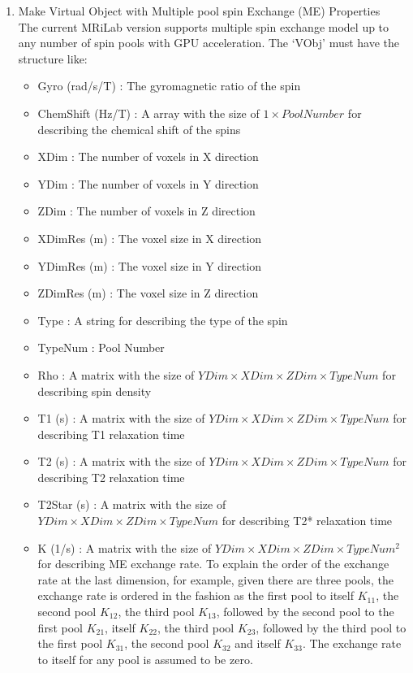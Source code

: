 \documentclass{book}%
\begin{document}
\begin{enumerate}
\item Make Virtual Object with Multiple pool spin Exchange (ME) Properties\\

The current MRiLab version supports multiple spin exchange model up to any number of spin pools with GPU acceleration. The `VObj' must have the structure like:

\begin{itemize}
	\item Gyro (rad/s/T) : The gyromagnetic ratio of the spin
	\item ChemShift (Hz/T) : A array with the size of $1 \times Pool Number $ for describing the chemical shift of the spins
	\item XDim : The number of voxels in X direction
	\item YDim : The number of voxels in Y direction
	\item ZDim : The number of voxels in Z direction
	\item XDimRes (m) : The voxel size in X direction
	\item YDimRes (m) : The voxel size in Y direction
	\item ZDimRes (m) : The voxel size in Z direction
	\item Type : A string for describing the type of the spin
	\item TypeNum : Pool Number
	\item Rho : A matrix with the size of $ YDim \times XDim \times ZDim \times TypeNum $ for describing spin density
	\item T1 (s) : A matrix with the size of $ YDim \times XDim \times ZDim \times TypeNum $ for describing T1 relaxation time
	\item T2 (s) : A matrix with the size of $ YDim \times XDim \times ZDim \times TypeNum $ for describing T2 relaxation time
	\item T2Star (s) : A matrix with the size of $ YDim \times XDim \times ZDim \times TypeNum $ for describing T2* relaxation time
	\item K (1/s) : A matrix with the size of $ YDim \times XDim \times ZDim \times TypeNum^2 $ for describing ME exchange rate. To explain the order of the exchange rate at the last dimension, for example, given there are three pools, the exchange rate is ordered in the fashion as the first pool to itself $K_{11}$, the second pool $K_{12}$, the third pool $K_{13}$, followed by the second pool to the first pool $K_{21}$, itself $K_{22}$, the third pool $K_{23}$, followed by the third pool to the first pool $K_{31}$, the second pool $K_{32}$ and itself $K_{33}$. The exchange rate to itself for any pool is assumed to be zero.
\end{itemize}


\end{enumerate}
\end{document}
